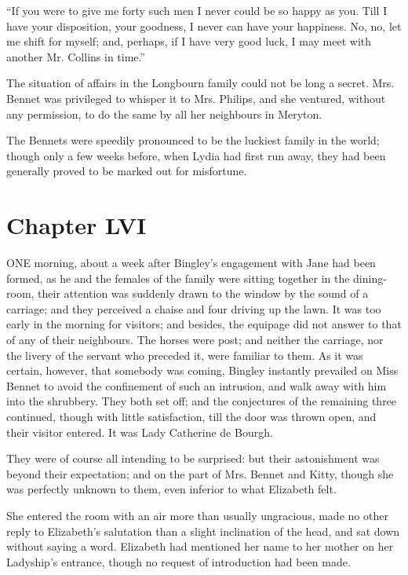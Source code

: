 \documentclass[12pt,openright]{book}
\begin{document}
“If you were to give me forty such men I never could be so happy as you. Till I have your disposition, your goodness, I never can have your happiness. No, no, let me shift for myself; and, perhaps, if I have very good luck, I may meet with another Mr. Collins in time.”

The situation of affairs in the Longbourn family could not be long a secret. Mrs. Bennet was privileged to whisper it to Mrs. Philips, and she ventured, without any permission, to do the same by all her neighbours in Meryton.

The Bennets were speedily pronounced to be the luckiest family in the world; though only a few weeks before, when Lydia had first run away, they had been generally proved to be marked out for misfortune.

\chapter{Chapter LVI}

\noindent  ONE morning, about a week after Bingley’s engagement with Jane had been formed, as he and the females of the family were sitting together in the dining-room, their attention was suddenly drawn to the window by the sound of a carriage; and they perceived a chaise and four driving up the lawn. It was too early in the morning for visitors; and besides, the equipage did not answer to that of any of their neighbours. The horses were post; and neither the carriage, nor the livery of the servant who preceded it, were familiar to them. As it was certain, however, that somebody was coming, Bingley instantly prevailed on Miss Bennet to avoid the confinement of such an intrusion, and walk away with him into the shrubbery. They both set off; and the conjectures of the remaining three continued, though with little satisfaction, till the door was thrown open, and their visitor entered. It was Lady Catherine de Bourgh.

They were of course all intending to be surprised: but their astonishment was beyond their expectation; and on the part of Mrs. Bennet and Kitty, though she was perfectly unknown to them, even inferior to what Elizabeth felt.

She entered the room with an air more than usually ungracious, made no other reply to Elizabeth’s salutation than a slight inclination of the head, and sat down without saying a word. Elizabeth had mentioned her name to her mother on her Ladyship’s entrance, though no request of introduction had been made.
\end{document}
